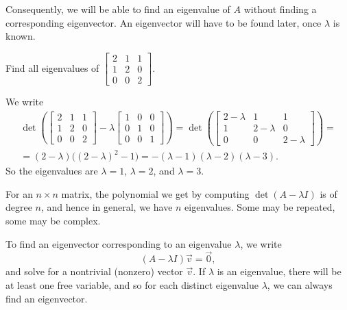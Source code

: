 Consequently, we will be able to find an eigenvalue of $A$ without
finding a corresponding eigenvector.  An eigenvector will have to be
found later, once $\lambda$ is known.

\begin{example}
Find all eigenvalues of 
$\left[ \begin{smallmatrix}
2 & 1 & 1 \\
1 & 2 & 0 \\
0 & 0 & 2
\end{smallmatrix} \right]$.
\end{example}

\begin{exampleSol}
We write
\begin{multline*}
\det \left(
\begin{bmatrix}
2 & 1 & 1 \\
1 & 2 & 0 \\
0 & 0 & 2
\end{bmatrix}
- \lambda 
\begin{bmatrix}
1 & 0 & 0 \\
0 & 1 & 0 \\
0 & 0 & 1
\end{bmatrix}
\right)
=
\det \left(
\begin{bmatrix}
2-\lambda & 1 & 1 \\
1 & 2-\lambda & 0 \\
0 & 0 & 2-\lambda
\end{bmatrix}
\right)
= \\
=
(2-\lambda) \bigl({(2-\lambda)}^2 - 1\bigr)
= 
-(\lambda -1)(\lambda -2)(\lambda-3) .
\end{multline*}
So the eigenvalues are $\lambda = 1$, $\lambda = 2$, and
$\lambda = 3$.
\end{exampleSol}

For an $n \times n$ matrix, the polynomial we get by
computing $\det(A - \lambda I)$ is of degree $n$, and hence
in general, we have $n$ eigenvalues.  Some may be repeated, some may be
complex.

\medskip

To find an eigenvector corresponding to an eigenvalue $\lambda$, we write
\begin{equation*}
(A-\lambda I) \vec{v} = \vec{0} ,
\end{equation*}
and solve for a nontrivial (nonzero) vector $\vec{v}$.
If $\lambda$ is an eigenvalue, there will be at least one
free variable, and so
for
each distinct eigenvalue $\lambda$, we can always find an eigenvector.

